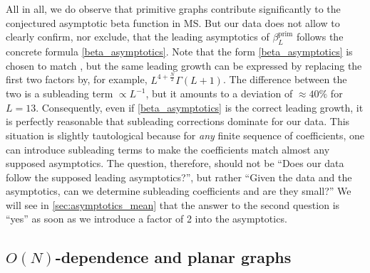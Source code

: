 \documentclass[12pt,a4paper]{article}
\renewcommand{\|}{\rule[-0.4ex]{0.2ex}{1.2em}}
\begin{document}
All in all, we do observe that primitive graphs contribute significantly to the conjectured asymptotic beta function in MS. But our data does not allow to clearly confirm, nor exclude, that the leading asymptotics of $\beta^{\text{prim}}_L$ follows the concrete formula \cref{beta_asymptotics}. Note that the form \cref{beta_asymptotics} is chosen to match \cite{mckane_perturbation_2019,kompaniets_minimally_2017}, but the same leading growth can be expressed by replacing the first two factors by, for example, $L^{4+\frac N 2}\Gamma(L+1)$. The difference between the two is a subleading term $\propto L^{-1}$, but it amounts to a deviation of $\approx 40\%$ for $L=13$. Consequently, even if \cref{beta_asymptotics} is the correct leading growth, it is perfectly reasonable that subleading corrections dominate for our data. This situation is slightly tautological because for \emph{any} finite sequence of coefficients, one can introduce subleading terms to make the coefficients match almost any supposed asymptotics. The question, therefore, should not be \enquote{Does our data follow the supposed leading asymptotics?}, but rather \enquote{Given the data and the asymptotics, can we determine subleading coefficients and are they small?} We will see in \cref{sec:asymptotics_mean} that the answer to the second question is \enquote{yes} as soon as we introduce a factor of 2 into the asymptotics.









\subsection[O(N)-dependence and planar graphs]{$O(N)$-dependence and planar graphs}\label{sec:beta_N_dependence}
\end{document}
